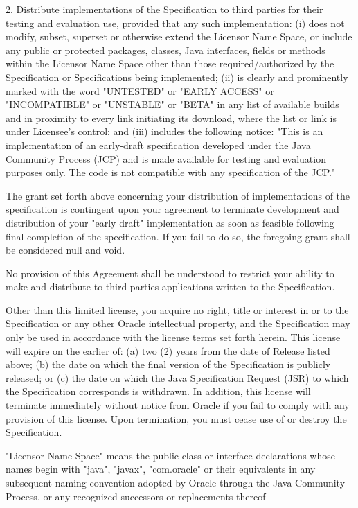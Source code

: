 \begin{flushleft}
2. Distribute implementations of the Specification to third parties for their testing and evaluation use, provided that any such implementation:
(i) does not modify, subset, superset or otherwise extend the Licensor Name Space, or include any public or protected packages, classes, Java interfaces, fields or methods within the Licensor Name Space other than those required/authorized by the Specification or Specifications being implemented;
(ii) is clearly and prominently marked with the word "UNTESTED" or "EARLY ACCESS" or "INCOMPATIBLE" or "UNSTABLE" or "BETA" in any list of available builds and in proximity to every link initiating its download, where the list or link is under Licensee's control; and
(iii) includes the following notice:
"This is an implementation of an early-draft specification developed under the Java Community Process (JCP) and is made available for testing and evaluation purposes only. The code is not compatible with
any specification of the JCP."

The grant set forth above concerning your distribution of implementations of the specification is contingent upon your agreement to terminate development and distribution of your "early draft" implementation as soon as feasible following final completion of the specification. If you fail to do so, the foregoing grant shall be considered null and void.

No provision of this Agreement shall be understood to restrict your ability to make and distribute to third parties applications written to the Specification.

Other than this limited license, you acquire no right, title or interest in or to the Specification or any other Oracle intellectual property, and the Specification may only be used in accordance with the license terms set forth herein. This license will expire on the earlier of: (a) two (2) years from the date of Release listed above; (b) the date on which the final version of the Specification is publicly released; or (c) the date on which the Java Specification Request (JSR) to which the Specification corresponds is withdrawn. In addition, this license will terminate immediately without notice from Oracle if you fail to comply with any provision of this license. Upon termination, you must cease use of or destroy the Specification.

"Licensor Name Space" means the public class or interface declarations whose names begin with "java", "javax", "com.oracle" or their equivalents in any subsequent naming convention adopted by Oracle through the Java Community Process, or any recognized successors or replacements thereof


\end{flushleft}
